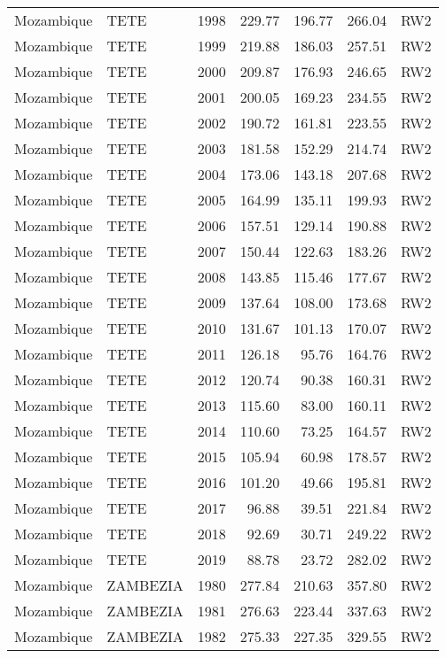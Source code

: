 \begin{longtable}{lllrrrl}
  Mozambique & TETE & 1998 & 229.77 & 196.77 & 266.04 & RW2 \\ 
  Mozambique & TETE & 1999 & 219.88 & 186.03 & 257.51 & RW2 \\ 
  Mozambique & TETE & 2000 & 209.87 & 176.93 & 246.65 & RW2 \\ 
  Mozambique & TETE & 2001 & 200.05 & 169.23 & 234.55 & RW2 \\ 
  Mozambique & TETE & 2002 & 190.72 & 161.81 & 223.55 & RW2 \\ 
  Mozambique & TETE & 2003 & 181.58 & 152.29 & 214.74 & RW2 \\ 
  Mozambique & TETE & 2004 & 173.06 & 143.18 & 207.68 & RW2 \\ 
  Mozambique & TETE & 2005 & 164.99 & 135.11 & 199.93 & RW2 \\ 
  Mozambique & TETE & 2006 & 157.51 & 129.14 & 190.88 & RW2 \\ 
  Mozambique & TETE & 2007 & 150.44 & 122.63 & 183.26 & RW2 \\ 
  Mozambique & TETE & 2008 & 143.85 & 115.46 & 177.67 & RW2 \\ 
  Mozambique & TETE & 2009 & 137.64 & 108.00 & 173.68 & RW2 \\ 
  Mozambique & TETE & 2010 & 131.67 & 101.13 & 170.07 & RW2 \\ 
  Mozambique & TETE & 2011 & 126.18 & 95.76 & 164.76 & RW2 \\ 
  Mozambique & TETE & 2012 & 120.74 & 90.38 & 160.31 & RW2 \\ 
  Mozambique & TETE & 2013 & 115.60 & 83.00 & 160.11 & RW2 \\ 
  Mozambique & TETE & 2014 & 110.60 & 73.25 & 164.57 & RW2 \\ 
  Mozambique & TETE & 2015 & 105.94 & 60.98 & 178.57 & RW2 \\ 
  Mozambique & TETE & 2016 & 101.20 & 49.66 & 195.81 & RW2 \\ 
  Mozambique & TETE & 2017 & 96.88 & 39.51 & 221.84 & RW2 \\ 
  Mozambique & TETE & 2018 & 92.69 & 30.71 & 249.22 & RW2 \\ 
  Mozambique & TETE & 2019 & 88.78 & 23.72 & 282.02 & RW2 \\ 
  Mozambique & ZAMBEZIA & 1980 & 277.84 & 210.63 & 357.80 & RW2 \\ 
  Mozambique & ZAMBEZIA & 1981 & 276.63 & 223.44 & 337.63 & RW2 \\ 
  Mozambique & ZAMBEZIA & 1982 & 275.33 & 227.35 & 329.55 & RW2 \\ 

\end{longtable}
